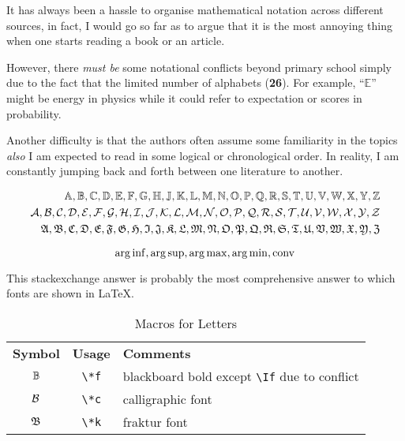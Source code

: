 It has always been a hassle to organise mathematical notation across different sources,
in fact, I would go so far as to argue that it is the most annoying thing
when one starts reading a book or an article.

However, there \textit{must be} some notational conflicts beyond primary school
simply due to the fact that the limited number of alphabets (\textbf{26}).
For example, ``$\mathbb{E}$'' might be energy in physics
while it could refer to expectation or scores in probability.

Another difficulty is that  the authors often assume some familiarity in the topics
\textit{also} I am expected to read in some logical or chronological order.
In reality, I am constantly jumping back and forth between one literature to another.

\begin{fullwidth}
    \begin{align*}
        \mathbb{A}, \mathbb{B}, \mathbb{C}, \mathbb{D}, \mathbb{E}, \mathbb{F}, \mathbb{G}, \mathbb{H}, \mathbb{J}, \mathbb{K}, \mathbb{L}, \mathbb{M}, \mathbb{N}, \mathbb{O}, \mathbb{P}, \mathbb{Q}, \mathbb{R}, \mathbb{S}, \mathbb{T}, \mathbb{U}, \mathbb{V}, \mathbb{W}, \mathbb{X}, \mathbb{Y}, \mathbb{Z}      \\
        \mathcal{A}, \mathcal{B}, \mathcal{C}, \mathcal{D}, \mathcal{E}, \mathcal{F}, \mathcal{G}, \mathcal{H}, \mathcal{I}, \mathcal{J}, \mathcal{K}, \mathcal{L}, \mathcal{M}, \mathcal{N}, \mathcal{O}, \mathcal{P}, \mathcal{Q}, \mathcal{R}, \mathcal{S}, \mathcal{T}, \mathcal{U}, \mathcal{V}, \mathcal{W}, \mathcal{X}, \mathcal{Y}, \mathcal{Z} \\
        \mathfrak{A}, \mathfrak{B}, \mathfrak{C}, \mathfrak{D}, \mathfrak{E}, \mathfrak{F}, \mathfrak{G}, \mathfrak{H}, \mathfrak{I}, \mathfrak{J}, \mathfrak{K}, \mathfrak{L}, \mathfrak{M}, \mathfrak{N}, \mathfrak{O}, \mathfrak{P}, \mathfrak{Q}, \mathfrak{R}, \mathfrak{S}, \mathfrak{T}, \mathfrak{U}, \mathfrak{V}, \mathfrak{W}, \mathfrak{X}, \mathfrak{Y}, \mathfrak{Z}
    \end{align*}
\end{fullwidth}
$$
    \operatorname*{arg\, inf}, \operatorname*{arg\, sup}, \operatorname*{arg\, max}, \operatorname*{arg\, min}, \mathrm{conv}
$$

This stackexchange answer 
is probably the most comprehensive answer to which fonts are shown in \LaTeX.

\begin{table}[h!]
    \centering\renewcommand{\arraystretch}{1.2}
    \begin{tabular}{ccl}
        \textbf{Symbol} & \textbf{Usage} & \textbf{Comments}                                 \\
        $\mathbb{B}$           & \verb|\*f|     & blackboard bold except \verb|\If| due to conflict \\
        $\mathcal{B}$           & \verb|\*c|     & calligraphic font                                 \\
        $\mathfrak{B}$           & \verb|\*k|     & fraktur font                                      \\
    \end{tabular}
    \label{tab:macro-letters}
    \caption{Macros for Letters}
\end{table}